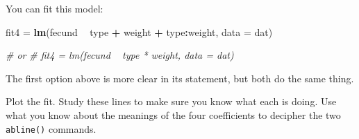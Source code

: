 \documentclass[]{book}
\newenvironment{Shaded}{\begin{snugshade}}{\end{snugshade}}
\newcommand{\KeywordTok}[1]{\textcolor[rgb]{0.13,0.29,0.53}{\textbf{#1}}}
\newcommand{\DataTypeTok}[1]{\textcolor[rgb]{0.13,0.29,0.53}{#1}}
\newcommand{\DecValTok}[1]{\textcolor[rgb]{0.00,0.00,0.81}{#1}}
\newcommand{\FloatTok}[1]{\textcolor[rgb]{0.00,0.00,0.81}{#1}}
\newcommand{\StringTok}[1]{\textcolor[rgb]{0.31,0.60,0.02}{#1}}
\newcommand{\CommentTok}[1]{\textcolor[rgb]{0.56,0.35,0.01}{\textit{#1}}}
\newcommand{\OperatorTok}[1]{\textcolor[rgb]{0.81,0.36,0.00}{\textbf{#1}}}
\newcommand{\NormalTok}[1]{#1}
\theoremstyle{definition}
\theoremstyle{definition}
\theoremstyle{definition}
\theoremstyle{remark}
\begin{document}
You can fit this model:

\begin{Shaded}
\begin{Highlighting}[]
\NormalTok{fit4 =}\StringTok{ }\KeywordTok{lm}\NormalTok{(fecund }\OperatorTok{~}\StringTok{ }\NormalTok{type }\OperatorTok{+}\StringTok{ }\NormalTok{weight }\OperatorTok{+}\StringTok{ }\NormalTok{type}\OperatorTok{:}\NormalTok{weight, }\DataTypeTok{data =}\NormalTok{ dat)}

\CommentTok{# or}
\CommentTok{# fit4 = lm(fecund ~ type * weight, data = dat)}
\end{Highlighting}
\end{Shaded}

The first option above is more clear in its statement, but both do the
same thing.

Plot the fit. Study these lines to make sure you know what each is
doing. Use what you know about the meanings of the four coefficients to
decipher the two \texttt{abline()} commands.

\begin{Shaded}
\end{Shaded}
\end{document}
